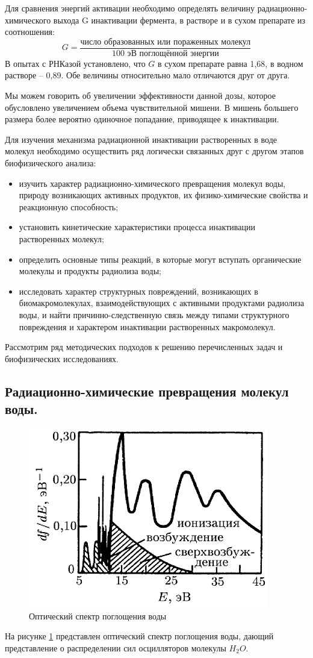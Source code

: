 \documentclass[a4paper, 14pt]{article}
\begin{document}
Для сравнения энергий активации необходимо определять величину
радиационно-химического выхода G инактивации фермента, в растворе и в сухом
препарате из соотношения:
\begin{equation}
    G = \frac{\text{число образованных или пораженных молекул}}{\text{100 эВ поглощённой энергии}}
\end{equation}
В опытах с РНКазой установлено, что $G$ в сухом препарате равна 1,68, в водном
растворе – 0,89. Обе величины относительно мало отличаются друг от друга.

Мы можем говорить об увеличении эффективности данной дозы, которое
обусловлено увеличением объема чувствительной мишени. В мишень большего
размера более вероятно одиночное попадание, приводящее к инактивации.

Для изучения механизма радиационной инактивации растворенных в воде
молекул необходимо осуществить ряд логически связанных друг с другом этапов
биофизического анализа:
\begin{itemize}
    \item изучить характер радиационно-химического превращения молекул воды,
    природу возникающих активных продуктов, их физико-химические свойства и
    реакционную способность;
    \item  установить кинетические характеристики процесса инактивации растворенных
    молекул;
    \item  определить основные типы реакций, в которые могут вступать органические
    молекулы и продукты радиолиза воды;
    \item  исследовать характер структурных повреждений, возникающих в
    биомакромолекулах, взаимодействующих с активными продуктами радиолиза воды, и
    найти причинно-следственную связь между типами структурного повреждения и
    характером инактивации растворенных макромолекул.
\end{itemize}
Рассмотрим ряд методических подходов к решению перечисленных задач и биофизических исследованиях.

\subsection{Радиационно-химические превращения молекул воды.}
\begin{figure}
    \centering
    \includegraphics[width=.4\textwidth]{spectrumOfWater.png}
    \caption{Оптический спектр поглощения воды}
    \label{spectrumOfWater}
\end{figure}
На рисунке \ref{spectrumOfWater} представлен оптический спектр поглощения воды, дающий представление о распределении сил осцилляторов молекулы $H_2O$. 
\end{document}
